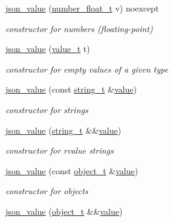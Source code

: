 \begin{DoxyCompactItemize}
\hyperlink{classnlohmann_1_1basic__json_a2e15685d39544db2bc5959705632fc04}{json\+\_\+value} (\hyperlink{classnlohmann_1_1basic__json_a5b8abaebd922d82d69756327c0c347e6}{number\+\_\+float\+\_\+t} v) noexcept
\begin{DoxyCompactList}\small\item\em constructor for numbers (floating-\/point) \end{DoxyCompactList}\item 
\hyperlink{classnlohmann_1_1basic__json_a60041447d13e8709028a46e50219c161}{json\+\_\+value} (\hyperlink{namespacenlohmann_1_1detail_a1ed8fc6239da25abcaf681d30ace4985}{value\+\_\+t} t)
\begin{DoxyCompactList}\small\item\em constructor for empty values of a given type \end{DoxyCompactList}\item 
\hyperlink{classnlohmann_1_1basic__json_a7e77b31f17b1b5f0ce72d3e6488b6d86}{json\+\_\+value} (const \hyperlink{classnlohmann_1_1basic__json_a33593865ffb1860323dcbd52425b90c8}{string\+\_\+t} \&\hyperlink{classnlohmann_1_1basic__json_ac9e014095170d72c4c57e3daf8efc059}{value})
\begin{DoxyCompactList}\small\item\em constructor for strings \end{DoxyCompactList}\item 
\hyperlink{classnlohmann_1_1basic__json_a2f3332829fc8117b48cba5a4a26ea76b}{json\+\_\+value} (\hyperlink{classnlohmann_1_1basic__json_a33593865ffb1860323dcbd52425b90c8}{string\+\_\+t} \&\&\hyperlink{classnlohmann_1_1basic__json_ac9e014095170d72c4c57e3daf8efc059}{value})
\begin{DoxyCompactList}\small\item\em constructor for rvalue strings \end{DoxyCompactList}\item 
\hyperlink{classnlohmann_1_1basic__json_a8a3eb027b86f4de2de4277410ceaa454}{json\+\_\+value} (const \hyperlink{classnlohmann_1_1basic__json_a5e3df077f880583a96d74cd63e173cb2}{object\+\_\+t} \&\hyperlink{classnlohmann_1_1basic__json_ac9e014095170d72c4c57e3daf8efc059}{value})
\begin{DoxyCompactList}\small\item\em constructor for objects \end{DoxyCompactList}\item 
\hyperlink{classnlohmann_1_1basic__json_a2544582412088703c778e882e2531af3}{json\+\_\+value} (\hyperlink{classnlohmann_1_1basic__json_a5e3df077f880583a96d74cd63e173cb2}{object\+\_\+t} \&\&\hyperlink{classnlohmann_1_1basic__json_ac9e014095170d72c4c57e3daf8efc059}{value})

\end{DoxyCompactItemize}
